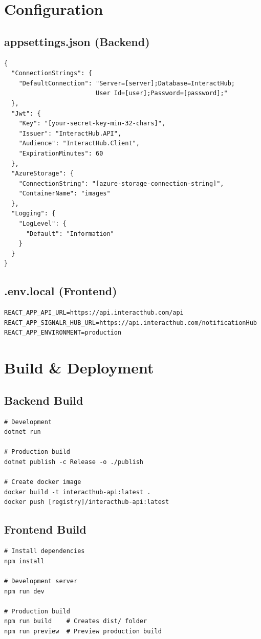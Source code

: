 \section{Configuration}

\subsection{appsettings.json (Backend)}
\begin{verbatim}
{
  "ConnectionStrings": {
    "DefaultConnection": "Server=[server];Database=InteractHub;
                         User Id=[user];Password=[password];"
  },
  "Jwt": {
    "Key": "[your-secret-key-min-32-chars]",
    "Issuer": "InteractHub.API",
    "Audience": "InteractHub.Client",
    "ExpirationMinutes": 60
  },
  "AzureStorage": {
    "ConnectionString": "[azure-storage-connection-string]",
    "ContainerName": "images"
  },
  "Logging": {
    "LogLevel": {
      "Default": "Information"
    }
  }
}
\end{verbatim}

\subsection{.env.local (Frontend)}
\begin{verbatim}
REACT_APP_API_URL=https://api.interacthub.com/api
REACT_APP_SIGNALR_HUB_URL=https://api.interacthub.com/notificationHub
REACT_APP_ENVIRONMENT=production
\end{verbatim}

\section{Build \& Deployment}

\subsection{Backend Build}
\begin{verbatim}
# Development
dotnet run

# Production build
dotnet publish -c Release -o ./publish

# Create docker image
docker build -t interacthub-api:latest .
docker push [registry]/interacthub-api:latest
\end{verbatim}

\subsection{Frontend Build}
\begin{verbatim}
# Install dependencies
npm install

# Development server
npm run dev

# Production build
npm run build    # Creates dist/ folder
npm run preview  # Preview production build
\end{verbatim}
